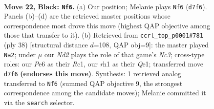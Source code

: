 \documentclass[11pt]{article}
\begin{document}
\clearpage

\begin{figure}[p]\centering
\begin{subfigure}{0.46\textwidth}\centering
\resizebox{\linewidth}{!}{%
\newchessgame
\chessboard[
  setfen={r1b1rk2/3nq2p/ppn1p1p1/2p1P3/P2p1Q2/2P5/1P3PPP/1KN1RBNR b - - 2 22},
  showmover=false,
  pgfstyle=straightmove, color=movearrow, markmove={d7-f6}
]}
\caption{}
\end{subfigure}\hfill
\begin{subfigure}{0.46\textwidth}\centering
\resizebox{\linewidth}{!}{%
\newchessgame
\chessboard[
  setfen={4r1k1/1brnqpp1/pp5p/3p4/P1pPn3/2N1PN1P/1PB2PP1/1RR1Q1K1 w - - 4 20},
  showmover=false,
  pgfstyle=straightmove, color=movearrow, markmove={c3-a2}
]}
\caption{}
\end{subfigure}
\\[4pt]

\caption{\textbf{Move 22, Black: \texttt{Nf6}.} (a) Our position; Melanie plays \texttt{Nf6} (\texttt{d7f6}). Panels (b)--(d) are the retrieved master positions whose correspondence most drove this move (highest QAP objective among those that transfer to it). (b) Retrieved from \texttt{ccrl\_top\_p0001\#781} (ply 38) [structural distance $d$=108, QAP obj=9]: the master played \texttt{Na2}; under $\mu$ our \emph{Nd2} plays the role of that game's \emph{Nc3}; cross-type roles: our \emph{P}e6 as their \emph{R}c1, our \emph{r}h1 as their \emph{Q}e1; transferred move \texttt{d7f6} \textbf{(endorses this move)}. Synthesis: 1 retrieved analog transferred to \texttt{Nf6} (summed QAP objective 9, the strongest correspondence among the candidate moves); Melanie committed it via the \texttt{search} selector.}
\label{fig:thought-m43}
\end{figure}

\clearpage
\end{document}
